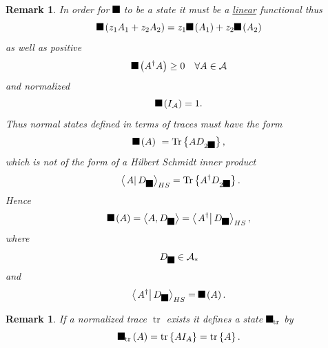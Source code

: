 \documentclass[aps,preprint]{revtex4}%
\providecommand{\U}[1]{\protect\rule{.1in}{.1in}}
\newtheorem{remark}[theorem]{Remark}
\begin{document}
\begin{remark}
In order for $\U{3c6} $ to be a state it must be a \underline{\emph{linear}}
functional thus
\begin{equation}
\U{3c6} \left(  z_{1}A_{1}+z_{2}A_{2}\right)  =z_{1}\U{3c6} \left(
A_{1}\right)  +z_{2}\U{3c6} \left(  A_{2}\right)
\end{equation}
as well as positive
\begin{equation}
\U{3c6} \left(  A^{\dagger}A\right)  \geq0\quad\forall A\in\mathcal{A}%
\end{equation}
and normalized
\begin{equation}
\U{3c6} \left(  I_{\mathcal{A}}\right)  =1.
\end{equation}
Thus normal states defined in terms of traces must have the form
\begin{equation}
\U{3c6} \left(  A\right)  \ =\operatorname{Tr}\left\{  AD_{2\U{3c6} }\right\}
,
\end{equation}
which is\emph{ not of the form} of a Hilbert Schmidt inner product
\begin{equation}
\ \left\langle \left.  A\right\vert D_{\U{3c6} }\right\rangle _{HS}%
=\operatorname{Tr}\left\{  A^{\dagger}D_{2\U{3c6} }\right\}  .
\end{equation}
Hence
\begin{equation}
\U{3c6} \left(  A\right)  =\left\langle A,D_{\U{3c6} }\right\rangle
=\left\langle \left.  A^{\dagger}\right\vert D_{\U{3c6} }\right\rangle _{HS},
\end{equation}
where
\begin{equation}
D_{\U{3c6} }\in\mathcal{A}_{\ast}%
\end{equation}
and
\begin{equation}
\left\langle \left.  A^{\dagger}\right\vert D_{\U{3c6} }\right\rangle
_{HS}=\U{3c6} \left(  A\right)  .
\end{equation}

\end{remark}

\begin{remark}
If a normalized trace $\operatorname*{tr}$ exists it defines a state $\U{3c6}
_{\operatorname*{tr}}$ by
\begin{equation}
\U{3c6} _{\operatorname*{tr}}\left(  A\right)  =\operatorname*{tr}\left\{
AI_{A}\right\}  =\operatorname*{tr}\left\{  A\right\}  .
\end{equation}

\end{remark}
\end{document}
